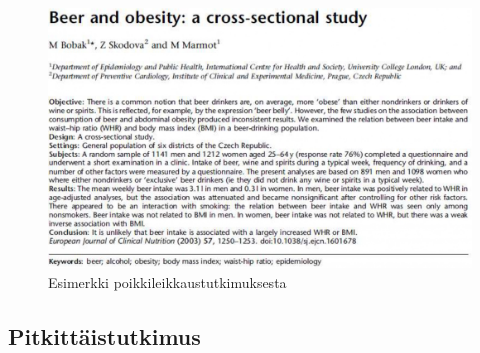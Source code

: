 \documentclass[
]{book}
\begin{document}
\begin{figure}

{\centering \includegraphics[width=1\linewidth]{images/cross} 

}

\caption{Esimerkki poikkileikkaustutkimuksesta}\label{fig:cross}
\end{figure}

\hfill\break

\hypertarget{pitkittuxe4istutkimus}{%
\subsection{\texorpdfstring{\textbf{Pitkittäistutkimus}}{Pitkittäistutkimus}}\label{pitkittuxe4istutkimus}}
\end{document}
